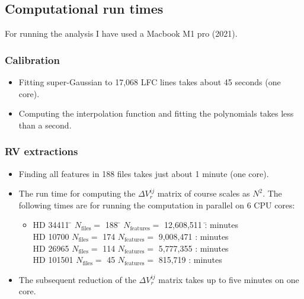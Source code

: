\subsection*{Computational run times}
For running the analysis I have used a Macbook M1 pro (2021).

\subsubsection*{Calibration}
\begin{itemize}
    \item Fitting super-Gaussian to 17,068 LFC lines takes about 45 seconds (one core).
    \item Computing the interpolation function and fitting the polynomials takes less than a second.
\end{itemize}

\subsubsection*{RV extractions}
\begin{itemize}
    \item Finding all features in 188 files takes just about 1 minute (one core).
    \item The run time for computing the $\Delta V_r^{ij}$ matrix of course scales as $N^2$. The following times are for running the computation in parallel on 6 CPU cores:
    \begin{itemize}
        \item[] \begin{tabbing}
            HD 34411 \hspace{0.5 cm} \= $N_{\text{files}} =$ 188 \hspace{0.5 cm} \= $N_{\text{features}} =$ 12,608,511 \hspace{0.25 cm} \= : minutes \\

            HD 10700    \> $N_{\text{files}} =$ 174 \> $N_{\text{features}} =$ 9,008,471   \> : minutes \\
            HD 26965    \> $N_{\text{files}} =$ 114 \> $N_{\text{features}} =$ 5,777,355   \> : minutes \\
            HD 101501   \> $N_{\text{files}} =$ 45 \> $N_{\text{features}} =$ 815,719     \> : minutes \\
        \end{tabbing}
    \end{itemize}
    \item The subsequent reduction of the $\Delta V_r^{ij}$ matrix takes up to five minutes on one core.
\end{itemize}

